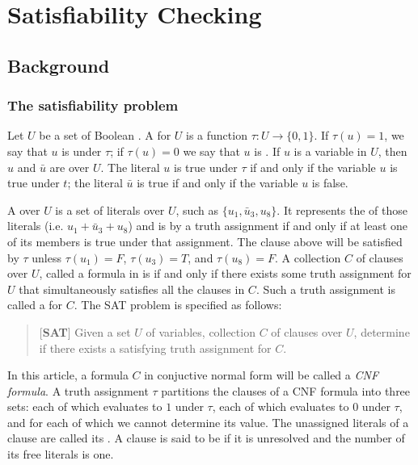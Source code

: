 \chapter{Satisfiability Checking}
\section{Background}
\subsection{The satisfiability problem}
Let $U$ be a set of Boolean . A  
for $U$ is a function $\tau: U \rightarrow \{0, 1\}$. If $\tau(u) = 1$,
we say that $u$ is  under $\tau$; if $\tau(u) = 0$ we say that 
$u$ is . If $u$ is a variable in $U$, then $u$ and $\bar{u}$ 
are  over $U$. The literal $u$ is true under $\tau$ if and 
only if the variable $u$ is true under $t$; the literal $\bar{u}$ is true 
if and only if the variable $u$ is false. 

A  over $U$ is a set of literals over $U$, such as $\{u_1,
\bar{u}_3, u_8\}$. It represents the  of those literals
(i.e. $u_1 + \bar{u}_3 + u_8$) and is  by a truth assignment
if and only if at least one of its members is true under that assignment. The
clause above will be satisfied by $\tau$ unless $\tau(u_1) = F$, $\tau(u_3) =
T$, and $\tau(u_8) = F$. A collection $C$ of clauses over $U$, called 
a formula in  is  if and
only if there exists some truth assignment for $U$ that simultaneously 
satisfies all the clauses in $C$. Such a truth assignment is called a
 for $C$. The SAT problem is specified 
as follows: 

\begin{quote}[{\bf{}SAT}]
Given a set $U$ of variables, collection $C$ of clauses over $U$, determine 
if there exists a satisfying truth assignment for $C$.
\end{quote}

In this article, a formula $C$ in conjuctive normal form will be called a {\em
  CNF formula}. 
A truth assignment $\tau$ partitions the clauses of a CNF formula into three
sets:  each of which evaluates to $1$ under $\tau$,
 each of which evaluates to $0$ under $\tau$, 
and  for each of which we cannot determine its
value. The unassigned literals of a clause are called its . A clause is said to be  if it is unresolved and the
number of its free literals is one.


